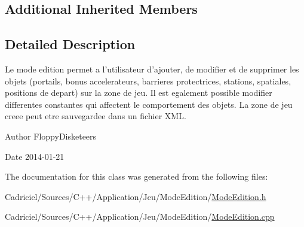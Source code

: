 \subsection*{Additional Inherited Members}


\subsection{Detailed Description}
Le mode edition permet a l'utilisateur d'ajouter, de modifier et de supprimer les objets (portails, bonus accelerateurs, barrieres protectrices, stations, spatiales, positions de depart) sur la zone de jeu. Il est egalement possible modifier differentes constantes qui affectent le comportement des objets. La zone de jeu creee peut etre sauvegardee dans un fichier X\-M\-L. 

\begin{DoxyAuthor}{Author}
Floppy\-Disketeers 
\end{DoxyAuthor}
\begin{DoxyDate}{Date}
2014-\/01-\/21 
\end{DoxyDate}


The documentation for this class was generated from the following files\-:\begin{DoxyCompactItemize}
\item 
Cadriciel/\-Sources/\-C++/\-Application/\-Jeu/\-Mode\-Edition/\hyperlink{_mode_edition_8h}{Mode\-Edition.\-h}\item 
Cadriciel/\-Sources/\-C++/\-Application/\-Jeu/\-Mode\-Edition/\hyperlink{_mode_edition_8cpp}{Mode\-Edition.\-cpp}\end{DoxyCompactItemize}
